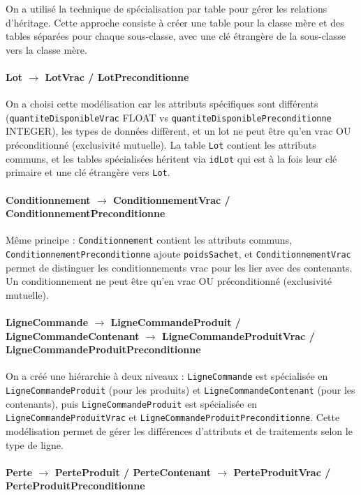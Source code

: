 On a utilisé la technique de spécialisation par table pour gérer les relations d'héritage. Cette approche consiste à créer une table pour la classe mère et des tables séparées pour chaque sous-classe, avec une clé étrangère de la sous-classe vers la classe mère.

\paragraph{Lot $\rightarrow$ LotVrac / LotPreconditionne}

On a choisi cette modélisation car les attributs spécifiques sont différents (\texttt{quantiteDisponibleVrac} FLOAT vs \texttt{quantiteDisponiblePreconditionne} INTEGER), les types de données diffèrent, et un lot ne peut être qu'en vrac OU préconditionné (exclusivité mutuelle). La table \texttt{Lot} contient les attributs communs, et les tables spécialisées héritent via \texttt{idLot} qui est à la fois leur clé primaire et une clé étrangère vers \texttt{Lot}.

\paragraph{Conditionnement $\rightarrow$ ConditionnementVrac / ConditionnementPreconditionne}

Même principe : \texttt{Conditionnement} contient les attributs communs, \texttt{ConditionnementPreconditionne} ajoute \texttt{poidsSachet}, et \texttt{ConditionnementVrac} permet de distinguer les conditionnements vrac pour les lier avec des contenants. Un conditionnement ne peut être qu'en vrac OU préconditionné (exclusivité mutuelle).

\paragraph{LigneCommande $\rightarrow$ LigneCommandeProduit / LigneCommandeContenant $\rightarrow$ LigneCommandeProduitVrac / LigneCommandeProduitPreconditionne}

On a créé une hiérarchie à deux niveaux : \texttt{LigneCommande} est spécialisée en \texttt{LigneCommandeProduit} (pour les produits) et \texttt{LigneCommandeContenant} (pour les contenants), puis \texttt{LigneCommandeProduit} est spécialisée en \texttt{LigneCommandeProduitVrac} et \texttt{LigneCommandeProduitPreconditionne}. Cette modélisation permet de gérer les différences d'attributs et de traitements selon le type de ligne.

\paragraph{Perte $\rightarrow$ PerteProduit / PerteContenant $\rightarrow$ PerteProduitVrac / PerteProduitPreconditionne}

